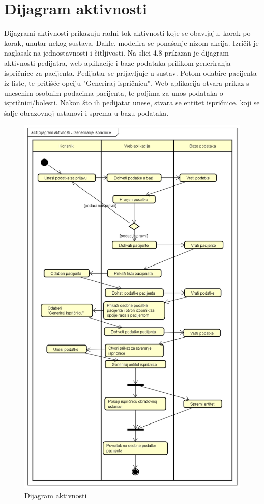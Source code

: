 			\eject 
		
		\section{Dijagram aktivnosti}
			
			\text Dijagrami aktivnosti prikazuju radni tok aktivnosti koje se obavljaju, korak po korak, unutar nekog sustava. Dakle, modelira se ponašanje nizom akcija. Izričit je naglasak na jednostavnosti i čitljivosti. Na slici 4.8 prikazan je dijagram aktivnosti pedijatra, web aplikacije i baze podataka prilikom generiranja ispričnice za pacijenta. Pedijatar se prijavljuje u sustav. Potom odabire pacijenta iz liste, te pritišće opciju "Generiraj ispričnicu". Web aplikacija otvara prikaz s unesenim osobnim podacima pacijenta, te poljima za unos podataka o ispričnici/bolesti. Nakon što ih pedijatar unese, stvara se entitet ispričnice, koji se šalje obrazovnoj ustanovi i sprema u bazu podataka.
			
			\begin{figure}[H]
				\includegraphics[scale=0.5]{dijagrami/dijakt1.PNG} %
				\centering
				\caption{Dijagram aktivnosti}
				\label{fig:dijakt1}
			\end{figure}
			
